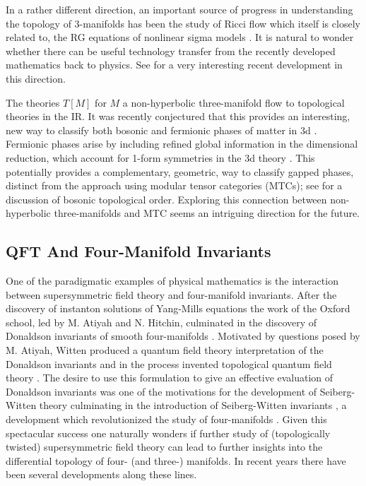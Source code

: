 \documentclass[12pt]{article}
\begin{document}
 
In a rather different direction, an important source of progress in understanding the topology 
of 3-manifolds has been the study of Ricci flow 
\cite{Hamilton-RicciFlow,Morgan-Tian-RicciFlow,Morgan-Tian-Geometrization,
Perelman:2006un,Perelman:2006up,Perelman:2003uq}  which itself is closely related to, the RG equations of nonlinear sigma models \cite{Callan:1985ia,Friedan:1980jm}. 
It is natural to wonder whether there can be useful technology transfer from the recently developed mathematics back to physics. See 
\cite{Frenkel:2020dic} for a very interesting recent development in this direction. 


The theories $T[M]$ for $M$ a non-hyperbolic three-manifold flow to topological theories in the IR. It was recently conjectured that this provides an interesting, new way to classify both bosonic and fermionic phases of matter in 3d \cite{Cho:2020ljj}. Fermionic phases arise by including refined global information in the dimensional reduction, which account for 1-form symmetries in the 3d theory \cite{Eckhard:2019jgg}. This potentially provides a complementary, geometric, way to classify gapped phases, distinct from the approach using modular tensor categories (MTCs); see \cite{WenTopologicalOrder, Etingofbook,Rowell:2018wnv,Kong:2022cpy} for a discussion of bosonic topological order. Exploring this connection between non-hyperbolic three-manifolds and MTC seems an intriguing direction for the future. 





\subsection{QFT And Four-Manifold Invariants}

One of the paradigmatic examples of physical
mathematics is the interaction between supersymmetric
field theory and four-manifold invariants. After the
discovery of instanton solutions of Yang-Mills equations \cite{Belavin:1975fg,Atiyah:1978ri}
the work of the Oxford school, led by M. Atiyah and N. Hitchin, culminated in the discovery
of Donaldson invariants of smooth four-manifolds \cite{DonaldsonKronheimer,FriedmanMorganDonaldsonInvt}. Motivated by
questions posed by M. Atiyah, Witten produced a quantum field theory interpretation
of the Donaldson invariants and in the process invented topological quantum field theory
\cite{Witten:1988ze}. The desire to use this formulation to give an effective
evaluation of Donaldson invariants was one of the motivations for the development
of Seiberg-Witten theory  \cite{Seiberg:1994aj,Seiberg:1994rs}  culminating in the
 introduction of Seiberg-Witten invariants \cite{Witten:1994cg},
a development which revolutionized the study of four-manifolds \cite{DonaldsonReview}. Given this spectacular success
one naturally wonders if further study of (topologically twisted) supersymmetric field theory
can lead to further insights into the differential topology of four- (and three-) manifolds.
In recent years there have been several developments along these lines.
\end{document}
